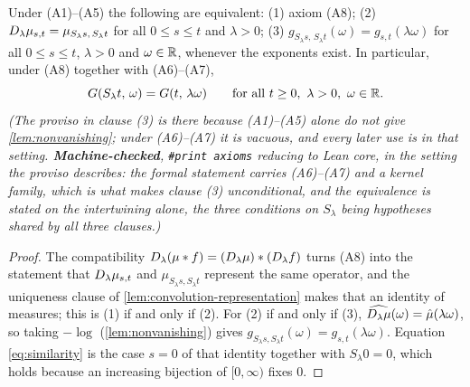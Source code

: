 \begin{lemma}\label{lem:covariance-fourier}
\leanok
{}
Under (A1)--(A5) the following are equivalent: (1) axiom (A8); (2)
$D_{\lambda}\mu_{s,t} = \mu_{S_\lambda s,\,S_\lambda t}$ for all $0 \le s \le t$ and
$\lambda > 0$; (3) $g_{S_\lambda s,\,S_\lambda t}(\omega) = g_{s,t}(\lambda\omega)$ for all
$0 \le s \le t$, $\lambda > 0$ and $\omega \in \mathbb{R}$, whenever the exponents exist. In
particular, under (A8) together with (A6)--(A7),
\begin{equation}\label{eq:similarity}
  G(S_\lambda t,\,\omega) = G(t,\,\lambda\omega)
  \qquad \text{for all } t \ge 0,\ \lambda > 0,\ \omega \in \mathbb{R} .
\end{equation}
\statusT\quad\emph{(The proviso in clause (3) is there because (A1)--(A5) alone do not give
\ref{lem:nonvanishing}; under (A6)--(A7) it is vacuous, and every later use is in that
setting. \textbf{Machine-checked}, \texttt{\#print axioms} reducing to Lean core, in the
setting the proviso describes: the formal statement carries (A6)--(A7) and a kernel family,
which is what makes clause (3) unconditional, and the equivalence is stated on the
intertwining alone, the three conditions on $S_\lambda$ being hypotheses shared by all three
clauses.)}
\end{lemma}

\begin{proof}
\leanok
The compatibility $D_{\lambda}(\mu * f) = (D_{\lambda}\mu) * (D_{\lambda}f)$ turns (A8)
into the statement that $D_{\lambda}\mu_{s,t}$ and $\mu_{S_\lambda s,S_\lambda t}$ represent
the same operator, and the uniqueness clause of \ref{lem:convolution-representation} makes
that an identity of measures; this is (1) if and only if (2). For (2) if and only if (3),
$\widehat{D_{\lambda}\mu}(\omega) = \hat\mu(\lambda\omega)$, so taking $-\log$
(\ref{lem:nonvanishing}) gives $g_{S_\lambda s,S_\lambda t}(\omega) = g_{s,t}(\lambda\omega)$.
Equation \ref{eq:similarity} is the case $s = 0$ of that identity together with
$S_\lambda 0 = 0$, which holds because an increasing bijection of $[0,\infty)$ fixes $0$.
\end{proof}

